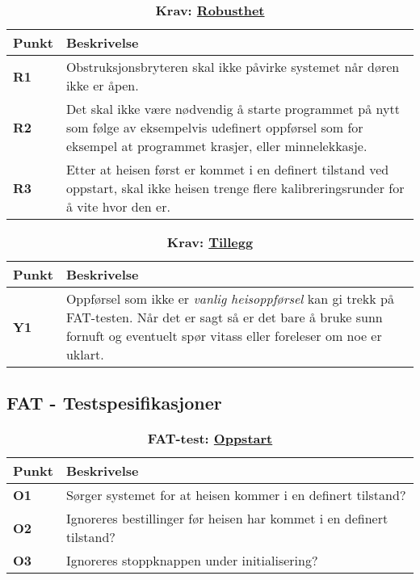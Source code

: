 \begin{table}[H]
    \centering
    \caption*{\textbf{\textcolor{NTNU_blue}{Krav}: \underline{Robusthet}}}
    \begin{tabular}{@{}  |p{1.25cm}| p{12.25cm}|  @{}}
    \hline
      \textbf{Punkt}             & \textbf{Beskrivelse} \\
    \hline
    \textbf{\textcolor{NTNU_blue}{R1}} & Obstruksjonsbryteren skal ikke påvirke systemet når døren ikke er åpen.\\\cline{1-2} 
    \textbf{\textcolor{NTNU_blue}{R2}} & Det skal ikke være nødvendig å starte programmet på nytt som følge av eksempelvis udefinert oppførsel som for eksempel at programmet krasjer, eller minnelekkasje.\\\cline{1-2} 
    \textbf{\textcolor{NTNU_blue}{R3}} & Etter at heisen først er kommet i en definert tilstand ved oppstart, skal ikke heisen trenge flere kalibreringsrunder for å vite hvor den er.\\\cline{1-2} 
    \end{tabular}
\end{table}


\begin{table}[H]
    \centering
    \caption*{\textbf{\textcolor{NTNU_blue}{Krav}: \underline{Tillegg}}}
    \begin{tabular}{@{}  |p{1.25cm}| p{12.25cm}|  @{}}
    \hline
      \textbf{Punkt}             & \textbf{Beskrivelse} \\
    \hline
    \textbf{\textcolor{NTNU_blue}{Y1}} & Oppførsel som ikke er \textit{vanlig heisoppførsel} kan gi trekk på FAT-testen. Når det er sagt så er det bare å bruke sunn fornuft og eventuelt spør vitass eller foreleser om noe er uklart.\\\cline{1-2} 
    \end{tabular}
\end{table}

\subsection{FAT - Testspesifikasjoner}\label{app:FAT-test}

\begin{table}[H]
    \centering
    \caption*{\textbf{\textcolor{RWTHrot100}{FAT-test}: \underline{Oppstart}}}
    \begin{tabular}{@{}  |p{1.25cm}| p{12.25cm}|  @{}}
    \hline
      \textbf{Punkt}             & \textbf{Beskrivelse} \\
    \hline
    \textbf{\textcolor{RWTHrot100}{O1}} & Sørger systemet for at heisen kommer i en definert tilstand?\\\cline{1-2} 
    \textbf{\textcolor{RWTHrot100}{O2}} & Ignoreres bestillinger før heisen har kommet i en definert tilstand?\\\cline{1-2} 
    \textbf{\textcolor{RWTHrot100}{O3}} & Ignoreres stoppknappen under initialisering?\\\cline{1-2} 
    \end{tabular}
\end{table}

